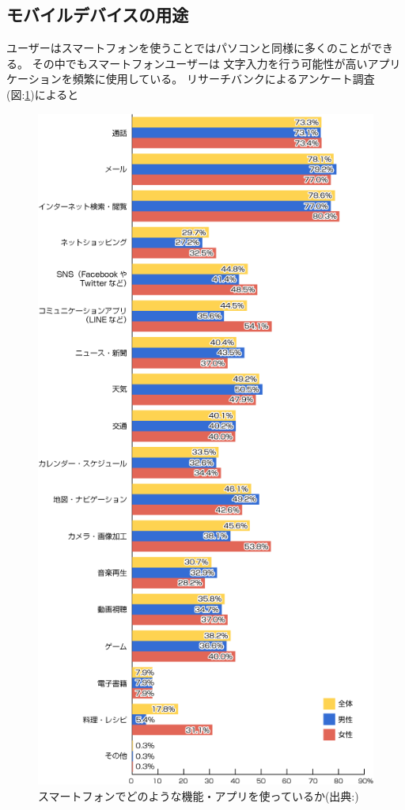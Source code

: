 \subsection{モバイルデバイスの用途}
ユーザーはスマートフォンを使うことではパソコンと同様に多くのことができる。
その中でもスマートフォンユーザーは
文字入力を行う可能性が高いアプリケーションを頻繁に使用している。
リサーチバンクによるアンケート調査\cite{researchbanksmartphone}
(図:\ref{fig:purpose})によると
\begin{figure}[htbp]
  \begin{center}
    \includegraphics[width=115mm,bb=0 0 500 1001]{images/purpose.png}
  \end{center}
  \caption{スマートフォンでどのような機能・アプリを使っているか(出典:\cite{researchbanksmartphone})}
  \label{fig:purpose}
\end{figure}
